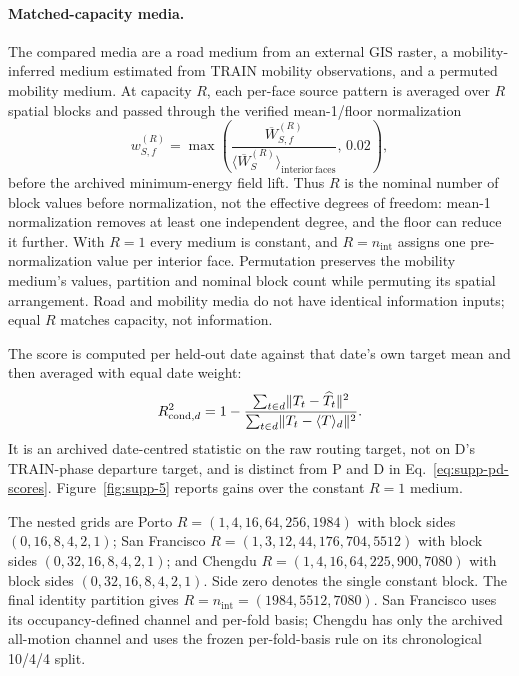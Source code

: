 \paragraph{Matched-capacity media.} The compared media are a road medium from an external GIS raster, a mobility-inferred medium estimated from TRAIN mobility observations, and a permuted mobility medium. At capacity $R$, each per-face source pattern is averaged over $R$ spatial blocks and passed through the verified mean-1/floor normalization
\begin{equation}
 w^{(R)}_{S,f}=\max\!\left(\frac{\overline W^{(R)}_{S,f}}{\langle\overline W^{(R)}_S\rangle_{\mathrm{interior\ faces}}},\,0.02\right),
 \label{eq:supp-medium-normalization}
\end{equation}
before the archived minimum-energy field lift. Thus $R$ is the nominal number of block values before normalization, not the effective degrees of freedom: mean-1 normalization removes at least one independent degree, and the floor can reduce it further. With $R=1$ every medium is constant, and $R=n_{\mathrm{int}}$ assigns one pre-normalization value per interior face. Permutation preserves the mobility medium's values, partition and nominal block count while permuting its spatial arrangement. Road and mobility media do not have identical information inputs; equal $R$ matches capacity, not information.

The score is computed per held-out date against that date's own target mean and then averaged with equal date weight:
\begin{equation}
 R^2_{\mathrm{cond},d}=1-\frac{\sum_{t\in d}\lVert T_t-\widehat T_t \rVert^2}{\sum_{t\in d}\lVert T_t-\langle T\rangle_d \rVert^2}.
 \label{eq:supp-conditional-score}
\end{equation}
It is an archived date-centred statistic on the raw routing target, not on D's TRAIN-phase departure target, and is distinct from P and D in Eq.~\ref{eq:supp-pd-scores}. Figure~\ref{fig:supp-5} reports gains over the constant $R=1$ medium.

The nested grids are Porto $R=(1,4,16,64,256,1984)$ with block sides $(0,16,8,4,2,1)$; San Francisco $R=(1,3,12,44,176,704,5512)$ with block sides $(0,32,16,8,4,2,1)$; and Chengdu $R=(1,4,16,64,225,900,7080)$ with block sides $(0,32,16,8,4,2,1)$. Side zero denotes the single constant block. The final identity partition gives $R=n_{\mathrm{int}}=(1984,5512,7080)$. San Francisco uses its occupancy-defined channel and per-fold basis; Chengdu has only the archived all-motion channel and uses the frozen per-fold-basis rule on its chronological 10/4/4 split.

